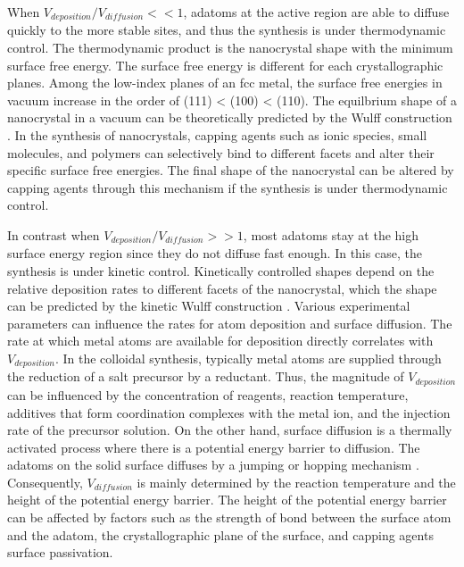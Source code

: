 When $V_{deposition}/V_{diffusion} << 1$, adatoms at the active region are able to diffuse quickly to the more stable sites, and thus the synthesis is under thermodynamic control.
The thermodynamic product is the nanocrystal shape with the minimum surface free energy.
The surface free energy is different for each crystallographic planes.
Among the low-index planes of an fcc metal, the surface free energies in vacuum increase in the order of (111) < (100) < (110).
The equilbrium shape of a nanocrystal in a vacuum can be theoretically predicted by the Wulff construction \cite{Bodineau_1999}.
In the synthesis of nanocrystals, capping agents such as ionic species, small molecules, and polymers can selectively bind to different facets and alter their specific surface free energies.
The final shape of the nanocrystal can be altered by capping agents through this mechanism if the synthesis is under thermodynamic control.

In contrast when $V_{deposition}/V_{diffusion} >> 1$, most adatoms stay at the high surface energy region since they do not diffuse fast enough.
In this case, the synthesis is under kinetic control.
Kinetically controlled shapes depend on the relative deposition rates to different facets of the nanocrystal, which the shape can be predicted by the kinetic Wulff construction \cite{Zhang_2006}.
Various experimental parameters can influence the rates for atom deposition and surface diffusion.
The rate at which metal atoms are available for deposition directly correlates with $V_{deposition}$.
In the colloidal synthesis, typically metal atoms are supplied through the reduction of a salt precursor by a reductant.
Thus, the magnitude of $V_{deposition}$ can be influenced by the concentration of reagents, reaction temperature, additives that form coordination complexes with the metal ion, and the injection rate of the precursor solution.
On the other hand, surface diffusion is a thermally activated process where there is a potential energy barrier to diffusion.
The adatoms on the solid surface diffuses by a jumping or hopping mechanism \cite{Tringides_1997}.
Consequently, $V_{diffusion}$ is mainly determined by the reaction temperature and the height of the potential energy barrier.
The height of the potential energy barrier can be affected by factors such as the strength of bond between the surface atom and the adatom, the crystallographic plane of the surface, and capping agents surface passivation.

  